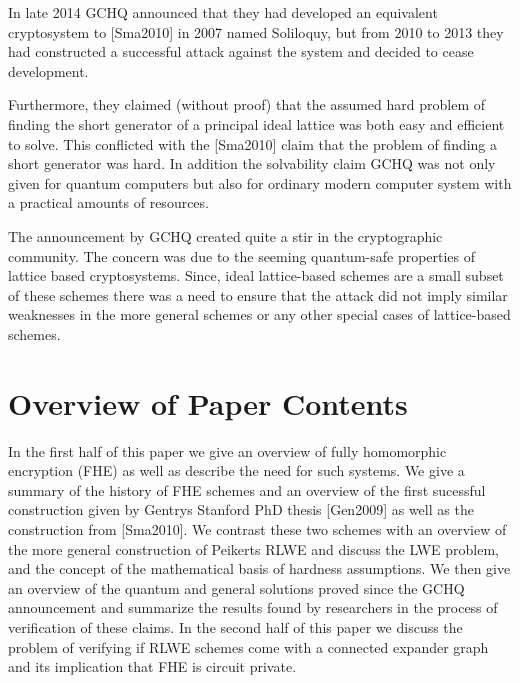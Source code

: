 \documentclass{article}
\begin{document}
In late 2014 GCHQ announced that they had developed an equivalent
cryptosystem to [Sma2010] in 2007 named Soliloquy, but from 2010 to
2013 they had constructed a successful attack against the system and
decided to cease development.

Furthermore, they claimed (without proof) that the assumed hard
problem of finding the short generator of a principal ideal lattice was
both easy and efficient to solve. This conflicted with the [Sma2010]
claim that the problem of finding a short generator was hard. In
addition the solvability claim GCHQ was not only given for quantum
computers but also for ordinary modern computer system with a practical
amounts of resources.

The announcement by GCHQ created quite a stir in the cryptographic
community. The concern was due to the seeming quantum-safe properties
of lattice based cryptosystems. Since, ideal lattice-based schemes are
a small subset of these schemes there was a need to ensure that the
attack did not imply similar weaknesses in the more general schemes or
any other special cases of lattice-based schemes.

\section{Overview of Paper Contents}

In the first half of this paper we give an overview of fully
homomorphic encryption (FHE) as well as describe the need for such
systems.
We give a summary of the history of FHE schemes and an overview of
the first sucessful construction given by Gentrys Stanford PhD thesis
[Gen2009] as well as the construction from [Sma2010].
We contrast these two schemes with an overview of the more general
construction of Peikerts RLWE and discuss the LWE problem, and the
concept of the mathematical basis of hardness assumptions.
We then give an overview of the quantum and general solutions proved
since the GCHQ announcement and summarize the results found by
researchers in the process of verification of these claims.
In the second half of this paper we discuss the problem of verifying
if RLWE schemes come with a connected expander graph and its
implication that FHE is circuit private.
\end{document}
